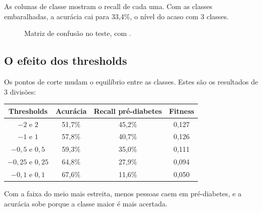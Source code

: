 \documentclass[11pt,a4paper]{article}
\newcommand{\code}[1]{\texttt{\detokenize{#1}}}
\newenvironment{tabela}{\par\nopagebreak[4]\vspace{0.3em}\nopagebreak[4]\begingroup\centering\small}{\par\endgroup\vspace{0.6em}}
\newcommand{\cmcell}[5]{%
  \pgfmathsetmacro{\intens}{8+80*(#3/#4)}%
  \pgfmathsetmacro{\escuro}{ifthenelse(\intens>62,1,0)}%
  \ifdim\escuro pt>0.5pt\def\corval{white}\else\def\corval{tinta}\fi
  \node[draw=white,line width=1.2pt,fill=azul!\intens,minimum width=#5 cm,minimum height=#5 cm,
    inner sep=0pt,text=\corval,font=\small] at (#1*#5,-#2*#5) {#3};}
\begin{document}
As colunas de classe mostram o recall de cada uma. Com as classes embaralhadas, a acurácia cai para 33,4\%, o nível do acaso com 3 classes.

\begin{figure}[H]
\centering
{}
\caption{Matriz de confusão no teste, com \code{seed=0}.}
\end{figure}

\subsection{O efeito dos thresholds}

Os pontos de corte mudam o equilíbrio entre as classes. Estes são os resultados de 3 divisões:

\begin{tabela}
\begin{tabular}{cccc}
\toprule
Thresholds & Acurácia & Recall pré-diabetes & Fitness\\
\midrule
$-2$ e $2$ & 51,7\% & 45,2\% & 0,127\\
$-1$ e $1$ & 57,8\% & 40,7\% & 0,126\\
$-0{,}5$ e $0{,}5$ & 59,3\% & 35,0\% & 0,111\\
$-0{,}25$ e $0{,}25$ & 64,8\% & 27,9\% & 0,094\\
$-0{,}1$ e $0{,}1$ & 67,6\% & 11,6\% & 0,050\\
\bottomrule
\end{tabular}
\end{tabela}

Com a faixa do meio mais estreita, menos pessoas caem em pré-diabetes, e a acurácia sobe porque a classe maior é mais acertada.
\end{document}
